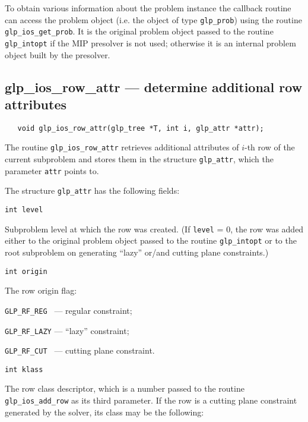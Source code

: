 
To obtain various information about the problem instance the callback
routine can access the problem object (i.e. the object of type
\verb|glp_prob|) using the routine \verb|glp_ios_get_prob|. It is the
original problem object passed to the routine \verb|glp_intopt| if the
MIP presolver is not used; otherwise it is an internal problem object
built by the presolver.

\newpage

\subsection{glp\_ios\_row\_attr --- determine additional row
attributes}

\synopsis

\begin{verbatim}
   void glp_ios_row_attr(glp_tree *T, int i, glp_attr *attr);
\end{verbatim}

\description

The routine \verb|glp_ios_row_attr| retrieves additional attributes of
$i$-th row of the current subproblem and stores them in the structure
\verb|glp_attr|, which the parameter \verb|attr| points to.

The structure \verb|glp_attr| has the following fields:

\medskip

{\tt int level}

Subproblem level at which the row was created. (If \verb|level| = 0,
the row was added either to the original problem object passed to the
routine \verb|glp_intopt| or to the root subproblem on generating
``lazy'' or/and cutting plane constraints.)

\medskip

{\tt int origin}

The row origin flag:

\verb|GLP_RF_REG | --- regular constraint;

\verb|GLP_RF_LAZY| --- ``lazy'' constraint;

\verb|GLP_RF_CUT | --- cutting plane constraint.

\medskip

{\tt int klass}

The row class descriptor, which is a number passed to the routine
\verb|glp_ios_add_row| as its third parameter. If the row is a cutting
plane constraint generated by the solver, its class may be the
following:

